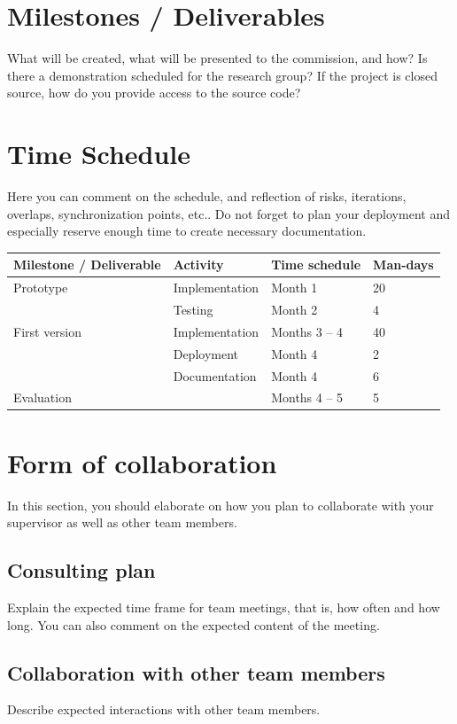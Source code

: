 \documentclass{article}
\begin{document}
\section{Milestones / Deliverables}
What will be created, what will be presented to the commission, and how?
Is there a demonstration scheduled for the research group?
If the project is closed source, how do you provide access to the source code?

\section{Time Schedule}
Here you can comment on the schedule, and reflection of risks, iterations, overlaps, synchronization points, etc..
Do not forget to plan your deployment and especially reserve enough time to create necessary documentation.

\hskip-0.5cm
\begin{tabular}{ | m{11em} | m{23em} | m{2.5cm} | m{1.3cm} | }
   \hline
 Milestone / Deliverable & Activity & Time schedule & Man-days \\
 \hline
 Prototype & Implementation & Month 1 & 20 \\
           & Testing & Month 2 & 4 \\
 \hline
 First version & Implementation & Months 3 -- 4 & 40 \\
               & Deployment & Month 4 & 2 \\
               & Documentation & Month 4 & 6 \\
 \hline
 Evaluation & & Months 4 -- 5 & 5 \\
 \hline
\end{tabular}

\section{Form of collaboration}
In this section, you should elaborate on how you plan to collaborate with your supervisor as well as other team members.

\subsection{Consulting plan}
Explain the expected time frame for team meetings, that is, how often and how long.
You can also comment on the expected content of the meeting.

\subsection{Collaboration with other team members}
Describe expected interactions with other team members.
\end{document}

